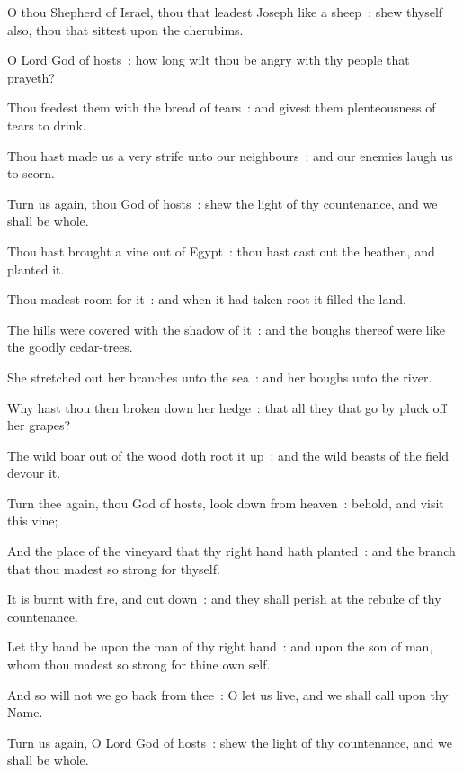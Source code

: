  O thou Shepherd of Israel, thou that leadest Joseph like a sheep~: shew thyself also, thou that sittest upon the cherubims.\par
{}
O Lord God of hosts~: how long wilt thou be angry with thy people that prayeth?\par
{}Thou feedest them with the bread of tears~: and givest them plenteousness of tears to drink.\par
{}Thou hast made us a very strife unto our neighbours~: and our enemies laugh us to scorn.\par
{}Turn us again, thou God of hosts~: shew the light of thy countenance, and we shall be whole.\par
{}Thou hast brought a vine out of Egypt~: thou hast cast out the heathen, and planted it.\par
{}Thou madest room for it~: and when it had taken root it filled the land.\par
{}The hills were covered with the shadow of it~: and the boughs thereof were like the goodly cedar-trees.\par
{}She stretched out her branches unto the sea~: and her boughs unto the river.\par
{}Why hast thou then broken down her hedge~: that all they that go by pluck off her grapes?\par
{}The wild boar out of the wood doth root it up~: and the wild beasts of the field devour it.\par
{}Turn thee again, thou God of hosts, look down from heaven~: behold, and visit this vine;\par
{}And the place of the vineyard that thy right hand hath planted~: and the branch that thou madest so strong for thyself.\par
{}It is burnt with fire, and cut down~: and they shall perish at the rebuke of thy countenance.\par
{}Let thy hand be upon the man of thy right hand~: and upon the son of man, whom thou madest so strong for thine own self.\par
{}And so will not we go back from thee~: O let us live, and we shall call upon thy Name.\par
{}Turn us again, O Lord God of hosts~: shew the light of thy countenance, and we shall be whole.\par

